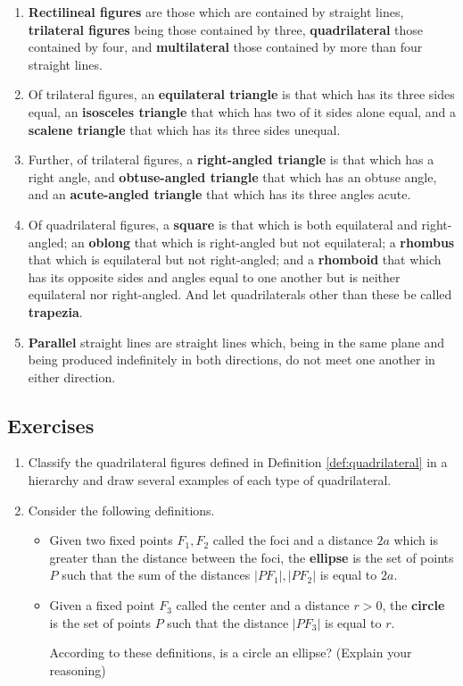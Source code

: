 \documentclass[
]{book}
\theoremstyle{definition}
\theoremstyle{definition}
\theoremstyle{definition}
\theoremstyle{definition}
\theoremstyle{remark}
\begin{document}
\begin{enumerate}
\item
  \textbf{Rectilineal figures} are those which are contained by straight lines, \textbf{trilateral figures} being those contained by three, \textbf{quadrilateral} those contained by four, and \textbf{multilateral} those contained by more than four straight lines.
\item
  Of trilateral figures, an \textbf{equilateral triangle} is that which has its three sides equal, an \textbf{isosceles triangle} that which has two of it sides alone equal, and a \textbf{scalene triangle} that which has its three sides unequal.
\item
  Further, of trilateral figures, a \textbf{right-angled triangle} is that which has a right angle, and \textbf{obtuse-angled triangle} that which has an obtuse angle, and an \textbf{acute-angled triangle} that which has its three angles acute.
\item
  Of quadrilateral figures, a \textbf{square} is that which is both equilateral and right-angled; an \textbf{oblong} that which is right-angled but not equilateral; a \textbf{rhombus} that which is equilateral but not right-angled; and a \textbf{rhomboid} that which has its opposite sides and angles equal to one another but is neither equilateral nor right-angled. And let quadrilaterals other than these be called \textbf{trapezia}.
\item
  \textbf{Parallel} straight lines are straight lines which, being in the same plane and being produced indefinitely in both directions, do not meet one another in either direction.
\end{enumerate}

\hypertarget{exercises-36}{%
\subsection{Exercises}\label{exercises-36}}

\begin{enumerate}
\def\labelenumi{\arabic{enumi}.}
\item
  Classify the quadrilateral figures defined in Definition \ref{def:quadrilateral} in a hierarchy and draw several examples of each type of quadrilateral.
\item
  Consider the following definitions.

  \begin{itemize}
  \item
    Given two fixed points \(F_1, F_2\) called the foci and a distance \(2a\) which is greater than the distance between the foci, the \textbf{ellipse} is the set of points \(P\) such that the sum of the distances \(|PF_{1}|, |PF_{2}|\) is equal to \(2a\).
  \item
    Given a fixed point \(F_3\) called the center and a distance \(r>0\), the \textbf{circle} is the set of points \(P\) such that the distance \(|PF_3|\) is equal to \(r\).

    According to these definitions, is a circle an ellipse? (Explain your reasoning)
  \end{itemize}
\end{enumerate}
\end{document}
